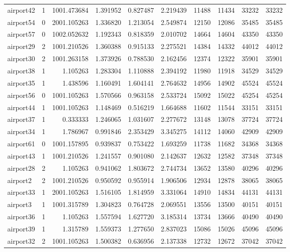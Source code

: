 \begin{longtable}{|l|r|r|r|r|r|r|r|r|r|}
airport42 & 1 & 1001.473684 & 1.391952 & 0.827487 & 2.219439 & 11488 & 11434 & 33232 & 33232 \\
airport54 & 0 & 2001.105263 & 1.336820 & 1.213054 & 2.549874 & 12150 & 12086 & 35485 & 35485 \\
airport57 & 0 & 1002.052632 & 1.192343 & 0.818359 & 2.010702 & 14664 & 14604 & 43350 & 43350 \\
airport29 & 2 & 1001.210526 & 1.360388 & 0.915133 & 2.275521 & 14384 & 14332 & 44012 & 44012 \\
airport30 & 2 & 1001.263158 & 1.373926 & 0.788530 & 2.162456 & 12374 & 12322 & 35901 & 35901 \\
airport38 & 1 & 1.105263 & 1.283304 & 1.110888 & 2.394192 & 11980 & 11918 & 34529 & 34529 \\
airport35 & 1 & 1.438596 & 1.160491 & 1.604141 & 2.764632 & 14956 & 14902 & 45524 & 45524 \\
airport56 & 0 & 1001.105263 & 1.570566 & 0.963158 & 2.533724 & 15092 & 15022 & 45254 & 45254 \\
airport44 & 1 & 1001.105263 & 1.148469 & 0.516219 & 1.664688 & 11602 & 11544 & 33151 & 33151 \\
airport37 & 1 & 0.333333 & 1.246065 & 1.031607 & 2.277672 & 13148 & 13078 & 37724 & 37724 \\
airport34 & 1 & 1.786967 & 0.991846 & 2.353429 & 3.345275 & 14112 & 14060 & 42909 & 42909 \\
airport61 & 0 & 1001.157895 & 0.939837 & 0.753422 & 1.693259 & 11738 & 11682 & 34368 & 34368 \\
airport43 & 1 & 1001.210526 & 1.241557 & 0.901080 & 2.142637 & 12632 & 12582 & 37348 & 37348 \\
airport28 & 2 & 1.105263 & 0.941062 & 1.803672 & 2.744734 & 13652 & 13580 & 40296 & 40296 \\
airport2 & 2 & 1001.210526 & 0.950592 & 0.955914 & 1.906506 & 12934 & 12878 & 38065 & 38065 \\
airport33 & 1 & 2001.105263 & 1.516105 & 1.814959 & 3.331064 & 14910 & 14834 & 44131 & 44131 \\
airport3 & 1 & 1001.315789 & 1.304823 & 0.764728 & 2.069551 & 13556 & 13500 & 40151 & 40151 \\
airport36 & 1 & 1.105263 & 1.557594 & 1.627720 & 3.185314 & 13734 & 13666 & 40490 & 40490 \\
airport39 & 1 & 1.315789 & 1.559373 & 1.277650 & 2.837023 & 15086 & 15026 & 45096 & 45096 \\
airport32 & 2 & 1001.105263 & 1.500382 & 0.636956 & 2.137338 & 12732 & 12672 & 37042 & 37042 \\

\end{longtable}
